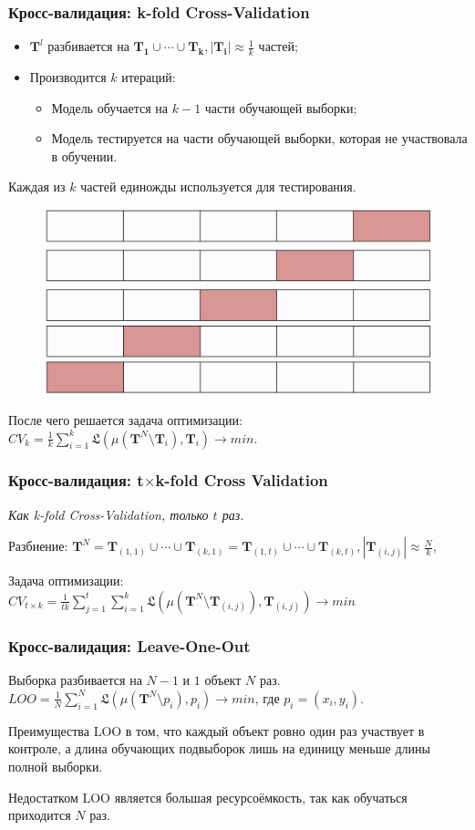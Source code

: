 \documentclass[11pt]{beamer}
\begin{document}
    \begin{frame}
		\frametitle{Кросс-валидация: k-fold Cross-Validation}
		\begin{itemize}
			\item $\bm{T}^l$ разбивается на $ \bm{T_1}\cup\cdots\cup\bm{T_k}, |\bm{T_i}|\approx \frac{1}{k} $ частей;
			\item Производится $ k $ итераций:
			\begin{itemize}
				\item Модель обучается на $ k-1 $ части обучающей выборки;
				\item Модель тестируется на части обучающей выборки, которая не участвовала в обучении.
			\end{itemize}
		\end{itemize}
		Каждая из $ k $ частей единожды используется для тестирования.
		
		\begin{figure}
			\includegraphics[width=0.4\linewidth]{../Report/imgs/K-fold-validation}
		\end{figure}
		После чего решается задача оптимизации:
		$CV_k = \frac{1}{k}\sum\limits_{i=1}^k\mathfrak{L}(\mu(\bm{T}^N \setminus \bm{T}_i), \bm{T}_i) \rightarrow min$.
	\end{frame}

	\begin{frame}
		\frametitle{Кросс-валидация: t$\times$k-fold Cross Validation}
		\begin{center}
			\textit{Как k-fold Cross-Validation, только $t$ раз.}
		\end{center}
		
		Разбиение:
		$\bm{T}^N = \bm{T}_{(1,1)}\cup\cdots\cup\bm{T}_{(k,1)}=\bm{T}_{(1,t)}\cup\cdots\cup\bm{T}_{(k,t)},|\bm{T}_{(i,j)}|\approx \frac{N}{k} $, 
		 
		Задача оптимизации: 
		$CV_{t\times k} = \frac{1}{tk}\sum\limits_{j=1}^t\sum\limits_{i=1}^k\mathfrak{L}(\mu(\bm{T}^N \setminus \bm{T}_{(i,j)}), \bm{T}_{(i,j)}) \rightarrow min$
	\end{frame}

	\begin{frame}
		\frametitle{Кросс-валидация: Leave-One-Out}
		Выборка разбивается на $ N-1 $ и $ 1 $ объект $ N $ раз.
		$LOO = \frac{1}{N}\sum\limits_{i=1}^N\mathfrak{L}(\mu(\bm{T}^N \setminus p_i), p_i) \rightarrow min$, где $ p_i = (x_i, y_i) $.
		
		Преимущества LOO в том, что каждый объект ровно один раз участвует в контроле, а длина обучающих подвыборок лишь на единицу меньше длины полной выборки.
		
		Недостатком LOO является большая ресурсоёмкость, так как обучаться приходится $ N $ раз.
	\end{frame}
\end{document}
